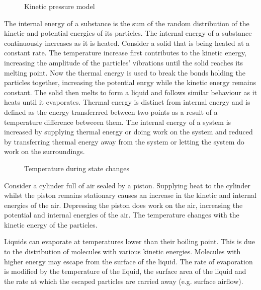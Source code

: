 \documentclass[a4,8pt]{article}
\begin{document}
\begin{figure}[H]
\begin{tikzpicture}
\end{tikzpicture}
\caption{Kinetic pressure model}
\end{figure}

The internal energy of a substance is the sum of the random distribution of the kinetic and 
potential energies of its particles. The internal energy of a substance continuously increases 
as it is heated. Consider a solid that is being heated at a constant rate. The temperature 
increase first contributes to the kinetic energy, increasing the amplitude of the particles' 
vibrations until the solid reaches its melting point. Now the thermal energy is used to break 
the bonds holding the particles together, increasing the potential enrgy while the kinetic 
energy remains constant. The solid then melts to form a liquid and follows similar behaviour 
as it heats until it evaporates. Thermal energy is distinct from internal energy and is defined
as the energy transferrred between two points as a result of a temperature difference betweeen 
them. The internal energy of a system is increased by supplying thermal energy or doing work on
the system and reduced by transferring thermal energy away from the system or letting the 
system do work on the surroundings.

\begin{figure}[H]
\begin{center}
\caption{Temperature during state changes}
\end{center}
\end{figure}

Consider a cylinder full of air sealed by a piston. Supplying heat to the cylinder whilst the 
piston remains stationary causes an increase in the kinetic and internal energies of the air. 
Depressing the piston does work on the air, increasing the potential and internal energies of 
the air. The temperature changes with the kinetic energy of the particles.

Liquids can evaporate at temperatures lower than their boiling point. This is due to the 
distribution of molecules with various kinetic energies. Molecules with higher energy may 
escape from the surface of the liquid. The rate of evaporation is modified by the temperature 
of the liquid, the surface area of the liquid and the rate at which the escaped particles are 
carried away (e.g. surface airflow).
\end{document}
